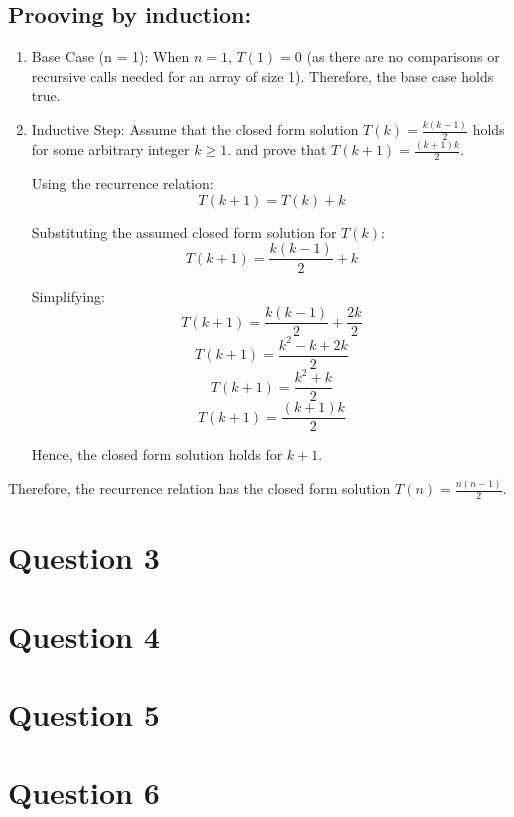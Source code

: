 \documentclass{article}
\begin{document}
\subsection*{Prooving by induction:}
\begin{enumerate}
    \item Base Case (n = 1):
          When \( n = 1 \), \( T(1) = 0 \) (as there are no comparisons or recursive calls needed for an array of size 1).
          Therefore, the base case holds true.

    \item Inductive Step:
          Assume that the closed form solution \( T(k) = \frac{k(k-1)}{2} \) holds for some arbitrary integer \( k \geq 1 \).
          and prove that \( T(k+1) = \frac{(k+1)k}{2} \).

          Using the recurrence relation:
          \[ T(k+1) = T(k) + k \]

          Substituting the assumed closed form solution for \( T(k) \):
          \[ T(k+1) = \frac{k(k-1)}{2} + k \]

          Simplifying:
          \[ T(k+1) = \frac{k(k-1)}{2} + \frac{2k}{2} \]
          \[ T(k+1) = \frac{k^2 - k + 2k}{2} \]
          \[ T(k+1) = \frac{k^2 + k}{2} \]
          \[ T(k+1) = \frac{(k+1)k}{2} \]

          Hence, the closed form solution holds for \( k+1 \).

\end{enumerate}
Therefore, the recurrence relation has the closed form solution \( T(n) = \frac{n(n-1)}{2} \).
\newpage
\section*{Question 3}
\newpage
\section*{Question 4}
\newpage
\section*{Question 5}
\newpage
\section*{Question 6}
\newpage
\end{document}
